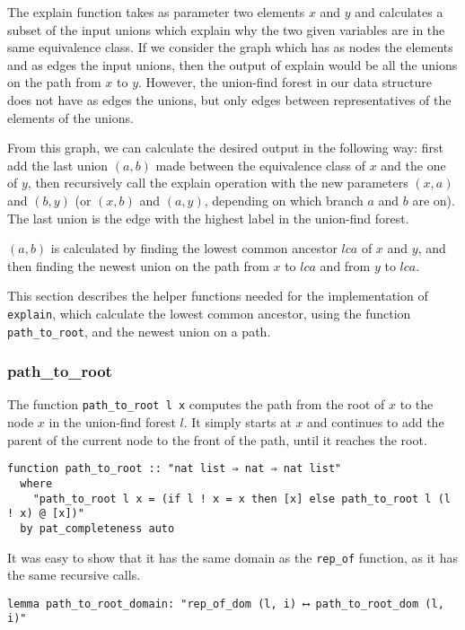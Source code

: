 The explain function takes as parameter two elements $x$ and $y$ and calculates a subset of the input unions which explain why the two given variables are in the same equivalence class. If we consider the graph which has as nodes the elements and as edges the input unions, then the output of explain would be all the unions on the path from $x$ to $y$. However, the union-find forest in our data structure does not have as edges the unions, but only edges between representatives of the elements of the unions.

From this graph, we can calculate the desired output in the following way: first add the last union $(a, b)$ made between the equivalence class of $x$ and the one of $y$, then recursively call the explain operation with the new parameters $(x, a)$ and $(b, y)$ (or $(x, b)$ and $(a, y)$, depending on which branch $a$ and $b$ are on). The last union is the edge with the highest label in the union-find forest.

$(a, b)$ is calculated by finding the lowest common ancestor $lca$ of $x$ and $y$, and then finding the newest union on the path from $x$ to $lca$ and from $y$ to $lca$.

This section describes the helper functions needed for the implementation of \lstinline|explain|, which calculate the lowest common ancestor, using the function \lstinline{path_to_root}, and the newest union on a path.

\subsubsection{path\_to\_root}
\label{subsubsection:path-to-root}

The function \lstinline{path_to_root l x} computes the path from the root of $x$ to the node $x$ in the union-find forest $l$. It simply starts at $x$ and continues to add the parent of the current node to the front of the path, until it reaches the root.

\begin{lstlisting}
function path_to_root :: "nat list ⇒ nat ⇒ nat list"
  where
    "path_to_root l x = (if l ! x = x then [x] else path_to_root l (l ! x) @ [x])"
  by pat_completeness auto
\end{lstlisting}

It was easy to show that it has the same domain as the \lstinline{rep_of} function, as it has the same recursive calls.

\begin{lstlisting}
lemma path_to_root_domain: "rep_of_dom (l, i) ⟷ path_to_root_dom (l, i)"
\end{lstlisting}

